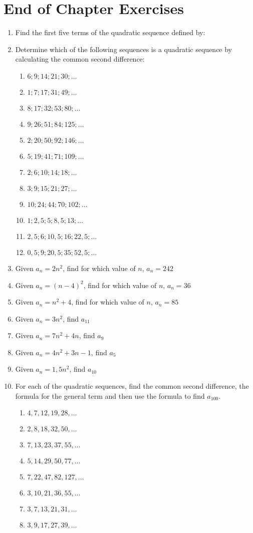 \section{End of Chapter Exercises}
\begin{enumerate}
\item{Find the first five terms of the quadratic sequence defined by:
}
\item{Determine which of the following sequences is a quadratic sequence by calculating the common second difference:
\begin{enumerate}
\item $6; 9; 14; 21; 30;\ldots$
\item $1; 7; 17; 31; 49;\ldots$
\item $8; 17; 32; 53; 80;\ldots$
\item $9; 26; 51; 84; 125;\ldots$
\item $2; 20; 50; 92; 146;\ldots$
\item $5; 19; 41; 71; 109;\ldots$
\item $2; 6; 10; 14; 18;\ldots$
\item $3; 9; 15; 21; 27;\ldots$
\item $10; 24; 44; 70; 102;\ldots$
\item $1; 2,5; 5; 8,5; 13;\ldots$
\item $2,5; 6; 10,5; 16; 22,5;\ldots$
\item $0,5; 9; 20,5; 35; 52,5;\ldots$
\end{enumerate}}
\item{Given $a_n= 2n^2$, find for which value of $n$, $a_n=242$}
\item{Given $a_n= (n - 4)^2$, find for which value of $n$, $a_n=36$}
\item{Given $a_n= n^2+4$, find for which value of $n$, $a_n=85$}
\item{Given $a_n= 3n^2$, find $a_{11}$}
\item{Given $a_n= 7n^2+4n$, find $a_{9}$}
\item{Given $a_n= 4n^2+3n-1$, find $a_{5}$}
\item{Given $a_n= 1,5n^2$, find $a_{10}$}
\item{For each of the quadratic sequences, find the common second difference, the formula for the general term and then use the formula to find $a_{100}$.
\begin{enumerate}
\item $4,7,12,19,28,\ldots$
\item $2,8,18,32,50,\ldots$
\item $7,13,23,37,55,\ldots$
\item $5,14,29,50,77,\ldots$
\item $7,22,47,82,127,\ldots$
\item $3,10,21,36,55,\ldots$
\item $3,7,13,21,31,\ldots$
\item $3,9,17,27,39,\ldots$
\end{enumerate}}

\end{enumerate}







